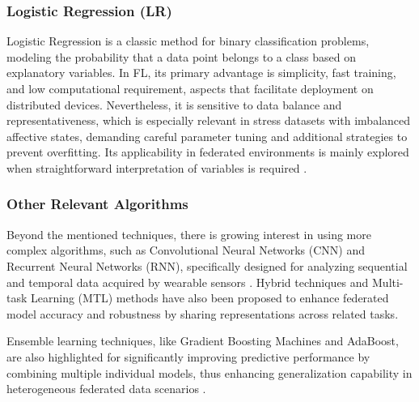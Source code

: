 \documentclass[12pt]{article}
\begin{document}
\subsubsection{Logistic Regression (LR)}

Logistic Regression is a classic method for binary classification problems, modeling the probability that a data point belongs to a class based on explanatory variables. In FL, its primary advantage is simplicity, fast training, and low computational requirement, aspects that facilitate deployment on distributed devices. Nevertheless, it is sensitive to data balance and representativeness, which is especially relevant in stress datasets with imbalanced affective states, demanding careful parameter tuning and additional strategies to prevent overfitting. Its applicability in federated environments is mainly explored when straightforward interpretation of variables is required \cite{abdulrahman_alahmadi_32bc288c}.


\subsubsection{Other Relevant Algorithms}

Beyond the mentioned techniques, there is growing interest in using more complex algorithms, such as Convolutional Neural Networks (CNN) and Recurrent Neural Networks (RNN), specifically designed for analyzing sequential and temporal data acquired by wearable sensors \cite{yekta_said_can_3e1184b6}. Hybrid techniques and Multi-task Learning (MTL) methods have also been proposed to enhance federated model accuracy and robustness by sharing representations across related tasks\cite{mohamed_benouis_35501772}.

Ensemble learning techniques, like Gradient Boosting Machines and AdaBoost, are also highlighted for significantly improving predictive performance by combining multiple individual models, thus enhancing generalization capability in heterogeneous federated data scenarios \cite{alaa_abd-alrazaq_e52622}.
\end{document}
